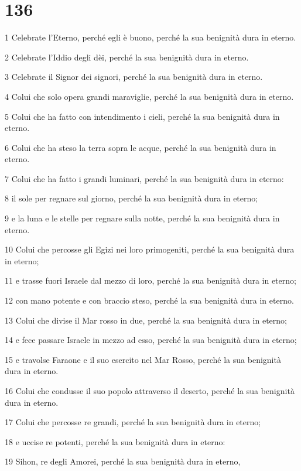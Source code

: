 \chapter{136}

\par 1 Celebrate l'Eterno, perché egli è buono, perché la sua benignità dura in eterno.
\par 2 Celebrate l'Iddio degli dèi, perché la sua benignità dura in eterno.
\par 3 Celebrate il Signor dei signori, perché la sua benignità dura in eterno.
\par 4 Colui che solo opera grandi maraviglie, perché la sua benignità dura in eterno.
\par 5 Colui che ha fatto con intendimento i cieli, perché la sua benignità dura in eterno.
\par 6 Colui che ha steso la terra sopra le acque, perché la sua benignità dura in eterno.
\par 7 Colui che ha fatto i grandi luminari, perché la sua benignità dura in eterno:
\par 8 il sole per regnare sul giorno, perché la sua benignità dura in eterno;
\par 9 e la luna e le stelle per regnare sulla notte, perché la sua benignità dura in eterno.
\par 10 Colui che percosse gli Egizi nei loro primogeniti, perché la sua benignità dura in eterno;
\par 11 e trasse fuori Israele dal mezzo di loro, perché la sua benignità dura in eterno;
\par 12 con mano potente e con braccio steso, perché la sua benignità dura in eterno.
\par 13 Colui che divise il Mar rosso in due, perché la sua benignità dura in eterno;
\par 14 e fece passare Israele in mezzo ad esso, perché la sua benignità dura in eterno;
\par 15 e travolse Faraone e il suo esercito nel Mar Rosso, perché la sua benignità dura in eterno.
\par 16 Colui che condusse il suo popolo attraverso il deserto, perché la sua benignità dura in eterno.
\par 17 Colui che percosse re grandi, perché la sua benignità dura in eterno;
\par 18 e uccise re potenti, perché la sua benignità dura in eterno:
\par 19 Sihon, re degli Amorei, perché la sua benignità dura in eterno,
